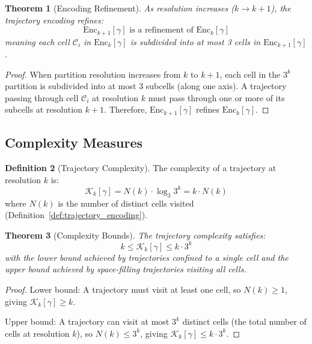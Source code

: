 \documentclass[11pt,twocolumn,a4paper]{article}
\newtheorem{theorem}{Theorem}[section]
\theoremstyle{definition}
\newtheorem{definition}[theorem]{Definition}
\theoremstyle{remark}
\begin{document}
\begin{theorem}[Encoding Refinement]
\label{thm:encoding_refinement}
As resolution increases ($k \to k+1$), the trajectory encoding refines:
\begin{equation}
\text{Enc}_{k+1}[\gamma] \text{ is a refinement of } \text{Enc}_k[\gamma]
\label{eq:encoding_refinement}
\end{equation}
meaning each cell $\mathcal{C}_i$ in $\text{Enc}_k[\gamma]$ is subdivided into at most 3 cells in $\text{Enc}_{k+1}[\gamma]$.
\end{theorem}

\begin{proof}
When partition resolution increases from $k$ to $k+1$, each cell in the $3^k$ partition is subdivided into at most 3 subcells (along one axis). A trajectory passing through cell $\mathcal{C}_i$ at resolution $k$ must pass through one or more of its subcells at resolution $k+1$. Therefore, $\text{Enc}_{k+1}[\gamma]$ refines $\text{Enc}_k[\gamma]$.
\end{proof}

\subsection{Complexity Measures}

\begin{definition}[Trajectory Complexity]
\label{def:trajectory_complexity}
The complexity of a trajectory at resolution $k$ is:
\begin{equation}
\mathcal{K}_k[\gamma] = N(k) \cdot \log_3 3^k = k \cdot N(k)
\label{eq:trajectory_complexity}
\end{equation}
where $N(k)$ is the number of distinct cells visited (Definition~\ref{def:trajectory_encoding}).
\end{definition}

\begin{theorem}[Complexity Bounds]
\label{thm:complexity_bounds}
The trajectory complexity satisfies:
\begin{equation}
k \leq \mathcal{K}_k[\gamma] \leq k \cdot 3^k
\label{eq:complexity_bounds}
\end{equation}
with the lower bound achieved by trajectories confined to a single cell and the upper bound achieved by space-filling trajectories visiting all cells.
\end{theorem}

\begin{proof}
Lower bound: A trajectory must visit at least one cell, so $N(k) \geq 1$, giving $\mathcal{K}_k[\gamma] \geq k$.

Upper bound: A trajectory can visit at most $3^k$ distinct cells (the total number of cells at resolution $k$), so $N(k) \leq 3^k$, giving $\mathcal{K}_k[\gamma] \leq k \cdot 3^k$.
\end{proof}
\end{document}
